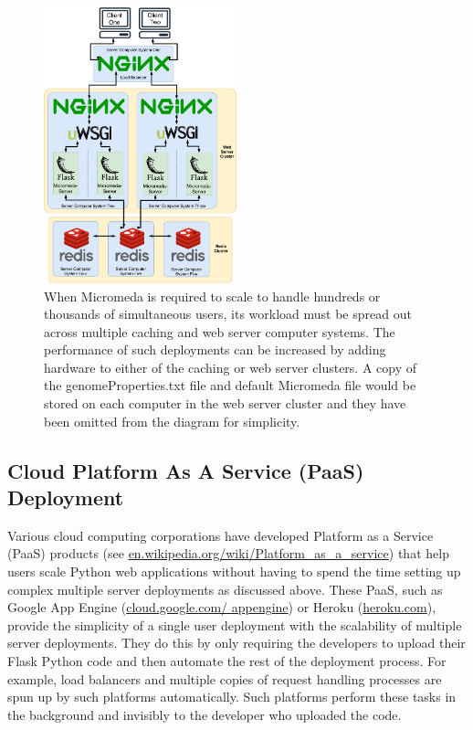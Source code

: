 \begin{figure}[!ht]
  \centering
	\includegraphics[width=0.50\textwidth]{media/micromeda-heavy-deployment.pdf}
	 \caption{When Micromeda is required to scale to handle hundreds or thousands of simultaneous users, its workload must be spread out across multiple caching and web server computer systems. The performance of such deployments can be increased by adding hardware to either of the caching or web server clusters. A copy of the genomeProperties.txt file and default Micromeda file would be stored on each computer in the web server cluster and they have been omitted from the diagram for simplicity.}
	 \label{fig:micromeda-large-deploy}
\end{figure}

\subsection{Cloud Platform As A Service (PaaS) Deployment}

Various cloud computing corporations have developed Platform as a Service (PaaS) \cite{lawton2008developing} products (see \href{en.wikipedia.org/wiki/Platform\_as\_a\_service}{en.wikipedia.org/wiki/Platform\_as\_a\_service}) that help users scale Python web applications without having to spend the time setting up complex multiple server deployments as discussed above. These PaaS, such as Google App Engine (\href{cloud.google.com/appengine}{cloud.google.com/ appengine}) or Heroku (\href{heroku.com}{heroku.com}), provide the simplicity of a single user deployment with the scalability of multiple server deployments. They do this by only requiring the developers to upload their Flask Python code and then automate the rest of the deployment process. For example, load balancers and multiple copies of request handling processes are spun up by such platforms automatically. Such platforms perform these tasks in the background and invisibly to the developer who uploaded the code.

